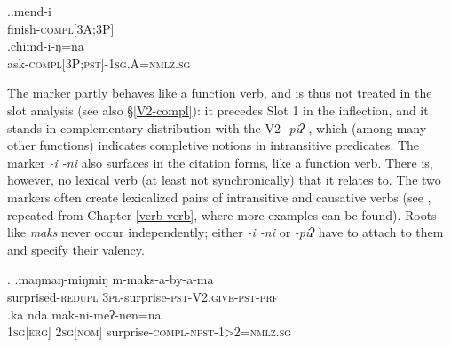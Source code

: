  \ex.\ag.mend-i\\
 finish{\scshape -compl[3A;3P]}\\
 \bg.chimd-i-ŋ=na\\
ask{\scshape -compl[3P;pst]-1sg.A=nmlz.sg}\\
 
The marker partly behaves like a function verb, and is thus not treated in the slot analysis (see also §\ref{V2-compl}): it precedes Slot 1 in the inflection, and it stands in complementary distribution with the V2 \emph{-piʔ} , which (among many other functions) indicates completive notions in intransitive  predicates. The marker \emph{-i \ti -ni} also surfaces in the citation forms, like a function verb. There is, however, no lexical verb (at least not synchronically) that it relates to. The two markers often create lexicalized pairs of intransitive and causative verbs (see \Next, repeated from Chapter \ref{verb-verb}, where more examples can be found). Roots like \emph{maks}  never occur independently; either \emph{-i \ti -ni} or \emph{-piʔ} have to attach to them and specify their valency. 

 
\ex. \ag.maŋmaŋ-miŋmiŋ m-maks-a-by-a-ma\\
	surprised{\scshape -redupl} {\scshape 3pl-}surprise{\scshape -pst-V2.give-pst-prf}\\
	 
 	\bg.ka nda mak-ni-meʔ-nen=na\\
	{\scshape 1sg[erg]} {\scshape 2sg[nom]} surprise{\scshape -compl-npst-1>2=nmlz.sg}		\\
	

 
 
 
 
